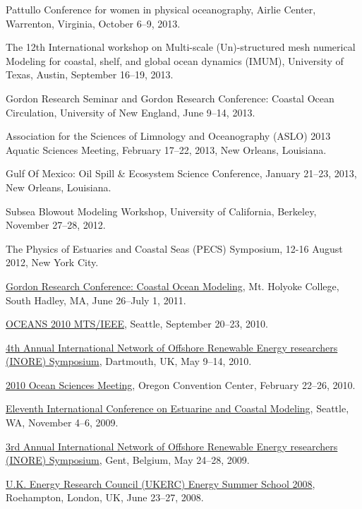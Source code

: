 \documentclass[10pt,letterpaper]{article}
\renewenvironment{itemize}{
  \begin{list}{}{
    \setlength{\leftmargin}{1.5em}
    \setlength{\itemsep}{0.25em}
    \setlength{\parskip}{0pt}
    \setlength{\parsep}{0.25em}
  }
}{
  \end{list}
}
\begin{document}
\begin{itemize}

\item Pattullo Conference for women in physical oceanography, Airlie Center, Warrenton, Virginia, October 6--9, 2013.

\item The 12th International workshop on Multi-scale (Un)-structured mesh numerical Modeling for coastal, shelf, and global ocean dynamics (IMUM), University of Texas, Austin, September 16--19, 2013.

\item Gordon Research Seminar and Gordon Research Conference: Coastal Ocean Circulation, University of New England, June 9--14, 2013.

\item Association for the Sciences of Limnology and Oceanography (ASLO) 2013 Aquatic Sciences Meeting, February 17--22, 2013, New Orleans, Louisiana.

\item Gulf Of Mexico: Oil Spill \& Ecosystem Science Conference, January 21--23, 2013, New Orleans, Louisiana.

\item Subsea Blowout Modeling Workshop, University of California, Berkeley, November 27--28, 2012.

\item The Physics of Estuaries and Coastal Seas (PECS) Symposium, 12-16 August 2012, New York City.

\item \href{http://www.grc.org/programs.aspx?year=2011&program=coastal}{Gordon Research Conference: Coastal Ocean Modeling},
  Mt. Holyoke College, South Hadley,  MA, 
  June 26--July 1, 2011.

\item \href{http://www.oceans10mtsieeeseattle.org/}{OCEANS 2010 MTS/IEEE},
  Seattle,
  September 20--23, 2010.

\item \href{http://www.inore.org}{4th Annual International Network of Offshore Renewable Energy researchers (INORE) Symposium},
  Dartmouth, UK,
  May 9--14, 2010.

\item \href{http://www.agu.org/meetings/os10/}{2010 Ocean Sciences Meeting},
  Oregon Convention Center,
  February 22--26, 2010.

\item \href{http://www.oce.uri.edu/ecm11/index.html}{Eleventh International Conference on Estuarine and Coastal Modeling},
  Seattle, WA,
  November 4--6, 2009.

\item \href{http://www.inore.org}{3rd Annual International Network of Offshore Renewable Energy researchers (INORE) Symposium},
  Gent, Belgium,
  May 24--28, 2009.

\item \href{http://www.ukerc.ac.uk/support/tiki-index.php?page=0608UKERCSummerSchool}{U.K. Energy Research Council (UKERC) Energy Summer School 2008},
  Roehampton, London, UK,
  June 23--27, 2008.

\end{itemize}
\end{document}
